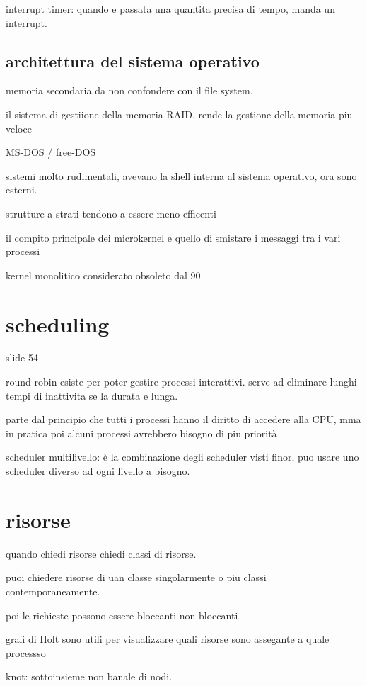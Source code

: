 \documentclass[12pt]{article}
\begin{document}
interrupt timer: quando e passata una quantita precisa di tempo, manda un interrupt.

\subsection{architettura del sistema operativo}

memoria secondaria da non confondere con il file system.

il sistema di gestiione della memoria RAID, rende la gestione della memoria piu veloce

MS-DOS / free-DOS

sistemi molto rudimentali, avevano la shell interna al sistema operativo, ora sono esterni.

strutture a strati tendono a essere meno efficenti

il compito principale dei microkernel e quello di smistare i messaggi tra i vari processi

kernel monolitico considerato obsoleto dal 90.

 \section{scheduling}

 slide 54

 round robin esiste per poter gestire processi interattivi. serve ad eliminare lunghi tempi di inattivita se la durata e lunga.

 parte dal principio che tutti i processi hanno il diritto di accedere alla CPU, mma in pratica poi alcuni processi avrebbero bisogno di piu priorità

 scheduler multilivello: è la combinazione degli scheduler visti finor, puo usare uno scheduler diverso ad ogni livello a bisogno.

 \section{risorse}

 quando chiedi risorse chiedi classi di risorse.

 puoi chiedere risorse di uan classe singolarmente o piu classi contemporaneamente.

 poi le richieste possono essere bloccanti non bloccanti

 grafi di Holt sono utili per visualizzare quali risorse sono assegante a quale processso

 knot: sottoinsieme non banale di nodi.
\end{document}

